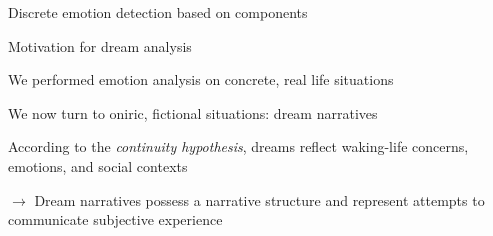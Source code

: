 \documentclass[handout,10pt]{beamer}
\newcommand{\smallcitep}[2][]{\text{\scriptsize \citep[#1]{#2}}} %
\begin{document}
\begin{frame}{Discrete emotion detection based on components}
\vspace{0.25cm}


\vspace{0.25cm}


\end{frame}

\begin{frame}{Motivation for dream analysis}

  We performed emotion analysis on concrete, real life situations

  \vspace{0.5cm}
  \pause

  We now turn to oniric, fictional situations: dream narratives

  \vspace{0.5cm}
  \pause

  According to the \textit{continuity hypothesis}, dreams reflect waking-life concerns, emotions, and social contexts \smallcitep{continuity}

  \vspace{0.5cm}
  \pause

  $\rightarrow$ Dream narratives possess a narrative structure and represent attempts to communicate subjective experience

\end{frame}
\end{document}
